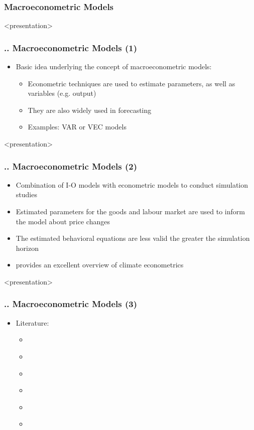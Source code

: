 \documentclass[11pt,aspectratio=169]{beamer}
\begin{document}
\subsubsection{Macroeconometric Models}
\begin{frame}<presentation>
	\frametitle{{\thesection.\thesubsection.\thesubsubsection} Macroeconometric Models (1)}
	\begin{itemize}		
		\item Basic idea underlying the concept of macroeconometric models:
		\begin{itemize}
			\item Econometric techniques are used to estimate parameters, as well as variables (e.g. output)
			\item They are also widely used in forecasting 
			\item Examples: VAR or VEC models
			\end{itemize}
	\end{itemize}
\end{frame}
\begin{frame}<presentation>
	\frametitle{{\thesection.\thesubsection.\thesubsubsection} Macroeconometric Models (2)}
	\begin{itemize}	
		\item Combination of I-O models with econometric models to conduct simulation studies 
		\item Estimated parameters for the goods and labour market are used to inform the model about price changes
		\item The estimated behavioral equations are less valid the greater the simulation horizon
		\item \cite{hsiang2016climate} provides an excellent overview of climate econometrics
	\end{itemize}
\end{frame}
\begin{frame}<presentation>
	\frametitle{{\thesection.\thesubsection.\thesubsubsection} Macroeconometric Models (3)}	
	\begin{itemize}
		\item Literature:
		\begin{itemize}		
			\item \cite{bloesch2015}
			\item  \cite{colacito2018}
			\item  \cite{dell2012}
			\item \cite{Deryng2014}
			\item \cite{tol1995}
			\item \cite{zivin2014}
		\end{itemize}
	\end{itemize}	
\end{frame}
\end{document}
